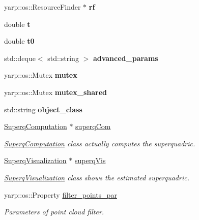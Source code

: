 \begin{DoxyCompactItemize}
\mbox{\label{classSuperqModule_ac781b86f89aab354c250c17cff49c2d8}} 
yarp\+::os\+::\+Resource\+Finder $\ast$ {\bfseries rf}
\item 
\mbox{\label{classSuperqModule_a7246f334af9922695d716a5afb4ce89e}} 
double {\bfseries t}
\item 
\mbox{\label{classSuperqModule_aa0788b39ee666e4cd09ea4c59421dc24}} 
double {\bfseries t0}
\item 
\mbox{\label{classSuperqModule_aa45e8a64fbe20bc54d9f303369a618aa}} 
std\+::deque$<$ std\+::string $>$ {\bfseries advanced\+\_\+params}
\item 
\mbox{\label{classSuperqModule_a04543bfe968184ff3ee55905c90f12ac}} 
yarp\+::os\+::\+Mutex {\bfseries mutex}
\item 
\mbox{\label{classSuperqModule_aa6671c2457e2044f3823d671a9b7e6ea}} 
yarp\+::os\+::\+Mutex {\bfseries mutex\+\_\+shared}
\item 
\mbox{\label{classSuperqModule_ae26497c030a1ecd16b98096c5842f383}} 
std\+::string {\bfseries object\+\_\+class}
\item 
\mbox{\label{classSuperqModule_adab3d841bcfd52387bb6dd861fddf424}} 
\mbox{\hyperlink{classSuperqComputation}{Superq\+Computation}} $\ast$ \mbox{\hyperlink{classSuperqModule_adab3d841bcfd52387bb6dd861fddf424}{superq\+Com}}
\begin{DoxyCompactList}\small\item\em \mbox{\hyperlink{classSuperqComputation}{Superq\+Computation}} class actually computes the superquadric. \end{DoxyCompactList}\item 
\mbox{\label{classSuperqModule_a91b35d4f88a0bfda1bb6f0bcfa6976b1}} 
\mbox{\hyperlink{classSuperqVisualization}{Superq\+Visualization}} $\ast$ \mbox{\hyperlink{classSuperqModule_a91b35d4f88a0bfda1bb6f0bcfa6976b1}{superq\+Vis}}
\begin{DoxyCompactList}\small\item\em \mbox{\hyperlink{classSuperqVisualization}{Superq\+Visualization}} class shows the estimated superquadric. \end{DoxyCompactList}\item 
\mbox{\label{classSuperqModule_a86c20777e5607bb326216605bab0e222}} 
yarp\+::os\+::\+Property \mbox{\hyperlink{classSuperqModule_a86c20777e5607bb326216605bab0e222}{filter\+\_\+points\+\_\+par}}
\begin{DoxyCompactList}\small\item\em Parameters of point cloud filter. \end{DoxyCompactList}\item 

\end{DoxyCompactItemize}

